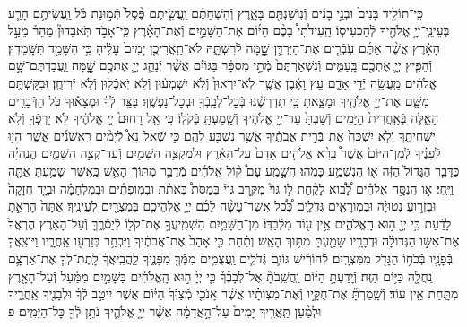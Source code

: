 \documentclass[twoside, openany, parskip=half, 11pt]{book}
\begin{document}
\begin{footnotesize}
\begin{multicols}{2}
\\
כִּֽי־תוֹלִ֤יד בָּנִים֙ וּבְנֵ֣י בָנִ֔ים וְֿנֽוֹשַׁנְתֶּ֖ם בָּאָ֑רֶץ וְֿהִשְׁחַתֶּ֗ם וַֽעֲשִׂ֤יתֶם פֶּ֨סֶל֙ תְּֿמ֣וּנַת כֹּ֔ל וַֽעֲשִׂיתֶ֥ם הָרַ֛ע בְּעֵינֵֽי־יְיָ֥ אֱלֹהֶ֖יךָ לְֿהַכְעִיסֽוֹ׃ הַֽעִידֹ֩תִי֩ בָכֶ֨ם הַיּ֜וֹם אֶת־הַשָּׁמַ֣יִם וְֿאֶת־הָאָ֗רֶץ כִּֽי־אָבֹ֣ד תֹּֽאבֵדוּן֘ מַהֵר֒ מֵעַ֣ל הָאָ֔רֶץ אֲשֶׁ֨ר אַתֶּ֜ם עֹֽבְֿרִ֧ים אֶת־הַיַּרְדֵּ֛ן שׇׇׇָׁ֖מָּה לְֿרִשְׁתָּ֑הּ לֹא־תַֽאֲרִיכֻ֤ן יָמִים֙ עָלֶ֔יהָ כִּ֥י הִשָּׁמֵ֖ד תִּשָּֽׁמֵדֽוּן׃ וְֿהֵפִ֧יץ יְיָ֛ אֶתְכֶ֖ם בָּֽעַמִּ֑ים וְֿנִשְׁאַרְתֶּם֙ מְֿתֵ֣י מִסְפָּ֔ר בַּגּוֹיִ֕ם אֲשֶׁ֨ר יְֿנַהֵ֧ג יְיָ֛ אֶתְכֶ֖ם שׇׇׇׇָֽׁמָּה׃ וַֽעֲבַדְתֶּם־שָׁ֣ם אֱלֹהִ֔ים מַֽעֲשֵׂ֖ה יְֿדֵ֣י אָדָ֑ם עֵ֣ץ וָאֶ֔בֶן אֲשֶׁ֤ר לֹֽא־יִרְאוּן֙ וְֿלֹ֣א יִשְׁמְע֔וּן וְֿלֹ֥א יֹֽאכְֿל֖וּן וְֿלֹ֥א יְֿרִיחֻֽן׃ וּבִקַּשְׁתֶּ֥ם מִשָּׁ֛ם אֶת־יְיָ֥ אֱלֹהֶ֖יךָ וּמָצָ֑אתָ כִּ֣י תִדְרְשֶׁ֔נּוּ בְּֿכׇל־לְבָֽבְֿךָ֖ וּבְכׇל־נַפְשֶֽׁךָ׃
בַּצַּ֣ר לְֿךָ֔ וּמְצָא֕וּךָ כֹּ֖ל הַדְּֿבָרִ֣ים הָאֵ֑לֶּה בְּֿאַֽחֲרִית֙ הַיָּמִ֔ים וְֿשַׁבְתָּ֙ עַד־יְיָ֣ אֱלֹהֶ֔יךָ וְֿשָֽׁמַעְתָּ֖ בְּֿקֹלֽוֹ׃ כִּ֣י אֵ֤ל רַחוּם֙ יְיָ֣ אֱלֹהֶ֔יךָ לֹ֥א יַרְפְּֿךָ֖ וְֿלֹ֣א יַשְׁחִיתֶ֑ךָ וְֿלֹ֤א יִשְׁכַּח֙ אֶת־בְּֿרִ֣ית אֲבֹתֶ֔יךָ אֲשֶׁ֥ר נִשְׁבַּ֖ע לָהֶֽם׃ כִּ֣י שְֿׁאַל־נָא֩ לְֿיָמִ֨ים רִֽאשֹׁנִ֜ים אֲשֶׁר־הָי֣וּ לְֿפָנֶ֗יךָ לְֿמִן־הַיּוֹם֙ אֲשֶׁר֩ בָּרָ֨א אֱלֹהִ֤ים אָדָם֙ עַל־הָאָ֔רֶץ וּלְמִקְצֵ֥ה הַשָּׁמַ֖יִם וְֿעַד־קְצֵ֣ה הַשָּׁמָ֑יִם הֲנִֽהְיָ֗ה כַּדָּבָ֤ר הַגָּדוֹל֙ הַזֶּ֔ה א֖וֹ הֲנִשְׁמַ֥ע כָּמֹֽהוּ׃ הֲשָׁ֣מַֽע עָם֩ ק֨וֹל אֱלֹהִ֜ים מְֿדַבֵּ֧ר מִתּוֹךְֿ־הָאֵ֛שׁ כַּֽאֲשֶׁר־שָׁמַ֥עְתָּ אַתָּ֖ה וַיֶּֽחִי׃ א֣וֹ הֲנִסָּ֣ה אֱלֹהִ֗ים לָ֠ב֠וֹא לָקַ֨חַת ל֣וֹ גּוֹי֘ מִקֶּ֣רֶב גּוֹי֒ בְּֿמַסֹּת֩ בְּֿאֹתֹ֨ת וּבְמֽוֹפְתִ֜ים וּבְמִלְחָמָ֗ה וּבְיָ֤ד חֲזָקָה֙ וּבִזְר֣וֹעַ נְֿטוּיָ֔ה וּבְמֽוֹרָאִ֖ים גְּֿדֹלִ֑ים כְּֿ֠כֹ֠ל אֲשֶׁר־עָשָׂ֨ה לָכֶ֜ם יְיָ֧ אֱלֹֽהֵיכֶ֛ם בְּֿמִצְרַ֖יִם לְֿעֵינֶֽיךָ׃ אַתָּה֙ הָרְֿאֵ֣תָ לָדַ֔עַת כִּ֥י יְיָ֖ ה֣וּא הָֽאֱלֹהִ֑ים אֵ֥ין ע֖וֹד מִלְּֿבַדּֽוֹ׃
מִן־הַשָּׁמַ֛יִם הִשְׁמִֽיעֲךָ֥ אֶת־קֹל֖וֹ לְֿיַסְּֿרֶ֑ךָּ וְֿעַל־הָאָ֗רֶץ הֶרְאֲךָ֙ אֶת־אִשּׁ֣וֹ הַגְּֿדוֹלָ֔ה וּדְבָרָ֥יו שָׁמַ֖עְתָּ מִתּ֥וֹךְ הָאֵֽשׁ׃ וְֿתַ֗חַת כִּ֤י אָהַב֙ אֶת־אֲבֹתֶ֔יךָ וַיִּבְחַ֥ר בְּֿזַרְע֖וֹ אַֽחֲרָ֑יו וַיּוֹצִֽאֲךָ֧ בְּֿפָנָ֛יו בְּֿכֹח֥וֹ הַגָּדֹ֖ל מִמִּצְרָֽיִם׃ לְֿהוֹרִ֗ישׁ גּוֹיִ֛ם גְּֿדֹלִ֧ים וַֽעֲצֻמִ֛ים מִמְּֿךָ֖ מִפָּנֶ֑יךָ לַֽהֲבִֽיאֲךָ֗ לָֽתֶת־לְךָ֧ אֶת־אַרְצָ֛ם נַֽחֲלָ֖ה כַּיּ֥וֹם הַזֶּֽה׃ וְֿיָֽדַעְתָּ֣ הַיּ֗וֹם וַֽהֲשֵֽׁבֹתָ֘ אֶל־לְבָבֶ֒ךָ֒ כִּ֤י יְיָ֙ ה֣וּא הָֽאֱלֹהִ֔ים בַּשָּׁמַ֣יִם מִמַּ֔עַל וְֿעַל־הָאָ֖רֶץ מִתָּ֑חַת אֵ֖ין עֽוֹד׃ וְֿשָֽׁמַרְתָּ֞ אֶת־חֻקָּ֣יו וְֿאֶת־מִצְוֹתָ֗יו אֲשֶׁ֨ר אָֽנֹכִ֤י מְֿצַוְּֿךָ֙ הַיּ֔וֹם אֲשֶׁר֙ יִיטַ֣ב לְֿךָ֔ וּלְבָנֶ֖יךָ אַֽחֲרֶ֑יךָ וּלְמַ֨עַן תַּֽאֲרִ֤יךְ יָמִים֙ עַל־הָ֣אֲדָמָ֔ה אֲשֶׁ֨ר יְיָ֤ אֱלֹהֶ֛יךָ נֹתֵ֥ן לְֿךָ֖ כׇּל־הַיָּמִֽים׃ פ


\end{multicols}
\end{footnotesize}
\end{document}
